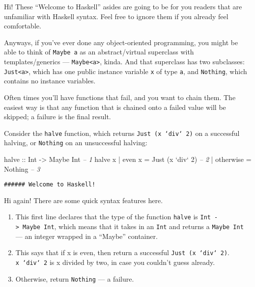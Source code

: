 \documentclass[]{article}
\newenvironment{Shaded}{}{}
\newcommand{\DataTypeTok}[1]{\textcolor[rgb]{0.56,0.13,0.00}{{#1}}}
\newcommand{\DecValTok}[1]{\textcolor[rgb]{0.25,0.63,0.44}{{#1}}}
\newcommand{\CommentTok}[1]{\textcolor[rgb]{0.38,0.63,0.69}{\textit{{#1}}}}
\newcommand{\OtherTok}[1]{\textcolor[rgb]{0.00,0.44,0.13}{{#1}}}
\newcommand{\FunctionTok}[1]{\textcolor[rgb]{0.02,0.16,0.49}{{#1}}}
\newcommand{\NormalTok}[1]{{#1}}
\begin{document}
Hi! These ``Welcome to Haskell'' asides are going to be for you readers
that are unfamiliar with Haskell syntax. Feel free to ignore them if you
already feel comfortable.

Anyways, if you've ever done any object-oriented programming, you might
be able to think of \texttt{Maybe\ a} as an abstract/virtual superclass
with templates/generics --- \texttt{Maybe\textless{}a\textgreater{}},
kinda. And that superclass has two subclasses:
\texttt{Just\textless{}a\textgreater{}}, which has one public instance
variable \texttt{x} of type \texttt{a}, and \texttt{Nothing}, which
contains no instance variables.

Often times you'll have functions that fail, and you want to chain them.
The easiest way is that any function that is chained onto a failed value
will be skipped; a failure is the final result.

Consider the \texttt{halve} function, which returns
\texttt{Just\ (x\ `div`\ 2)} on a successful halving, or
\texttt{Nothing} on an unsuccessful halving:

\begin{Shaded}
\begin{Highlighting}[]
\OtherTok{halve ::} \DataTypeTok{Int} \OtherTok{->} \DataTypeTok{Maybe} \DataTypeTok{Int}                       \CommentTok{-- 1}
\NormalTok{halve x }\FunctionTok{|} \NormalTok{even x    }\FunctionTok{=} \DataTypeTok{Just} \NormalTok{(x }\OtherTok{`div`} \DecValTok{2}\NormalTok{)          }\CommentTok{-- 2}
        \FunctionTok{|} \NormalTok{otherwise }\FunctionTok{=} \DataTypeTok{Nothing}                   \CommentTok{-- 3}
\end{Highlighting}
\end{Shaded}

\begin{verbatim}
###### Welcome to Haskell!
\end{verbatim}

Hi again! There are some quick syntax features here.

\begin{enumerate}
\def\labelenumi{\arabic{enumi}.}
\tightlist
\item
  This first line declares that the type of the function \texttt{halve}
  is \texttt{Int\ -\textgreater{}\ Maybe\ Int}, which means that it
  takes in an \texttt{Int} and returns a \texttt{Maybe\ Int} --- an
  integer wrapped in a ``Maybe'' container.
\item
  This says that if x is even, then return a successful
  \texttt{Just\ (x\ `div`\ 2)}. \texttt{x\ `div`\ 2} is x divided by
  two, in case you couldn't guess already.
\item
  Otherwise, return \texttt{Nothing} --- a failure.
\end{enumerate}
\end{document}
